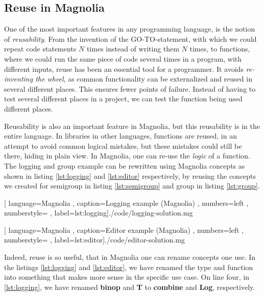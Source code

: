 \subsection{Reuse in Magnolia}

One of the most important features in any programming language, is the notion
of \textit{reusability}. From the invention of the GO-TO-statement, with which
we could repeat code statements $N$ times instead of writing them $N$ times, to
functions, where we could run the same piece of code several times in a
program, with different inputs, reuse has been an essential tool for a
programmer. It avoids \textit{re-inventing the wheel}, as common functionality
can be externalized and reused in several different places. This ensures
fewer points of failure. Instead of having to test several different places in
a project, we can test the function being used different places.

Reusability is also an important feature in Magnolia, but this reusability is in
the entire language. In libraries in other languages, functions are reused, in
an attempt to avoid common logical mistakes, but these mistakes could still be
there, hiding in plain view. In Magnolia, one can re-use the \textit{logic} of a
function. The logging and group example can be rewritten using Magnolia concepts
as shown in listing \ref{lst:logging} and \ref{lst:editor} respectively, by
reusing the concepts we created for semigroup in listing \ref{lst:semigroup} and group
in listing \ref{lst:group}.

\begin{code}[H]
  
    [ language=Magnolia
    , caption={Logging example (Magnolia)}
    , numbers=left
    , numberstyle=\tiny\color{gray}
    , label=lst:logging]{./code/logging-solution.mg}
\end{code}

\begin{code}[H]
  
    [ language=Magnolia
    , caption={Editor example (Magnolia)}
    , numbers=left
    , numberstyle=\tiny\color{gray}
    , label=lst:editor]{./code/editor-solution.mg}
\end{code}

Indeed, reuse is so useful, that in Magnolia one can rename concepts one use.
In the listings \ref{lst:logging} and \ref{lst:editor}, we have renamed the type
and function into something that makes more sense in the specific use case. On
line four, in \ref{lst:logging}, we have renamed \textbf{binop} and \textbf{T}
to \textbf{combine} and \textbf{Log}, respectively.

